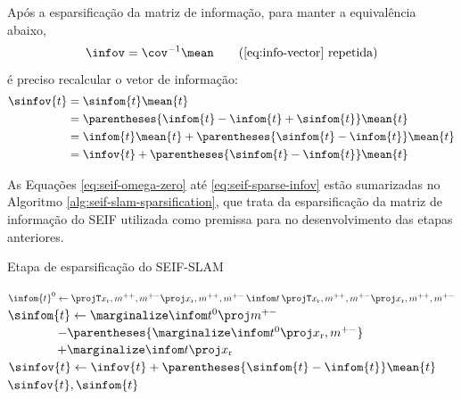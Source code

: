 Após a esparsificação da matriz de informação, para manter a equivalência abaixo,
\begin{equation*}
  \ifcorrespondence \tag{\ref{eq:info-vector} repetida}
\end{equation*}
é preciso recalcular o vetor de informação:
\begin{equation}
\begin{aligned}
  \sinfov{t} &= \sinfom{t} \mean{t}\\
  &= \parentheses{\infom{t} - \infom{t} + \sinfom{t}} \mean{t}\\
  &= \infom{t}\mean{t} + \parentheses{\sinfom{t} - \infom{t}}\mean{t}\\
  &= \infov{t} + \parentheses{\sinfom{t} - \infom{t}}\mean{t}\\
\end{aligned}
\label{eq:seif-sparse-infov}
\end{equation}

As Equações \ref{eq:seif-omega-zero} até \ref{eq:seif-sparse-infov} 
estão sumarizadas no Algoritmo \ref{alg:seif-slam-sparsification}, que 
trata da esparsificação da matriz de informação do SEIF utilizada 
como premissa para no desenvolvimento das etapas anteriores.

\begin{algorithm}[h]
  \caption{Etapa de esparsificação do SEIF-SLAM}
  \label{alg:seif-slam-sparsification}
\begin{algorithmic}[1]
  \State {}
  \State $\infom{t}^0 \gets \OmegaZeroValue$
  \State $\sinfom{t} \gets \OmegaOneValue $\\$\qquad \qquad - \parentheses{\OmegaTwoValue}$\\$\qquad\qquad + \OmegaThreeValue$
  \State $\sinfov{t} \gets \infov{t} + \parentheses{\sinfom{t} - \infom{t}}\mean{t}$
  \State \Return $\sinfov{t}, \sinfom{t}$
  \EndProcedure
\end{algorithmic}
\end{algorithm}

